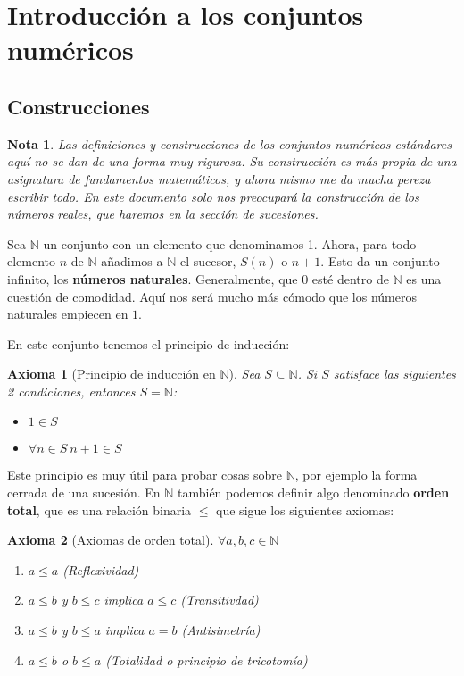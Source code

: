 \documentclass{article}
\author{NyKi}
\date{Diciembre 2024}
\newtheorem{axiom}{Axioma}
\newtheorem{note}{Nota}
\newcommand{\naturales}{\mathbb{N}}
\begin{document}
\section{Introducción a los conjuntos numéricos}

\subsection{Construcciones}

\begin{note}
Las definiciones y construcciones de los conjuntos numéricos estándares aquí no se dan de una forma muy rigurosa. Su construcción es más propia de una asignatura de fundamentos matemáticos, y ahora mismo me da mucha pereza escribir todo. En este documento solo nos preocupará la construcción de los números reales, que haremos en la sección de sucesiones.
\end{note}

Sea $\mathbb{N}$ un conjunto con un elemento que denominamos 1. Ahora, para todo elemento $n$ de $\naturales$ añadimos a $\naturales$ el sucesor, $S(n)$ o $n+1$. Esto da un conjunto infinito, los \textbf{números naturales}. Generalmente, que $0$ esté dentro de $\mathbb{N}$ es una cuestión de comodidad. Aquí nos será mucho más cómodo que los números naturales empiecen en $1$.

En este conjunto tenemos el principio de inducción:

\begin{axiom}[Principio de inducción en $\naturales$]
Sea $S \subseteq \mathbb{N}$. Si $S$ satisface las siguientes 2 condiciones, entonces $S = \mathbb{N}$:
\begin{itemize}
\item
$1 \in S$
\item
$\forall n \in S \ n+1 \in S$
\end{itemize}
\end{axiom}

Este principio es muy útil para probar cosas sobre $\mathbb{N}$, por ejemplo la forma cerrada de una sucesión. En $\mathbb{N}$ también podemos definir algo denominado \textbf{orden total}, que es una relación binaria  $\leq$ que sigue los siguientes axiomas:
\begin{axiom}[Axiomas de orden total]
$\forall a,b,c \in \mathbb{N}$
\begin{enumerate}
	\item
	$a \leq a$ (Reflexividad)
	\item
	$a \leq b$ y $b \leq c$ implica $a \leq c$ (Transitivdad)
	\item
	$a \leq b$ y $b \leq a$ implica $a = b$ (Antisimetría)
	\item
	$a \leq b$ o $b \leq a$ (Totalidad o principio de tricotomía)
\end{enumerate}
\end{axiom}
\end{document}
